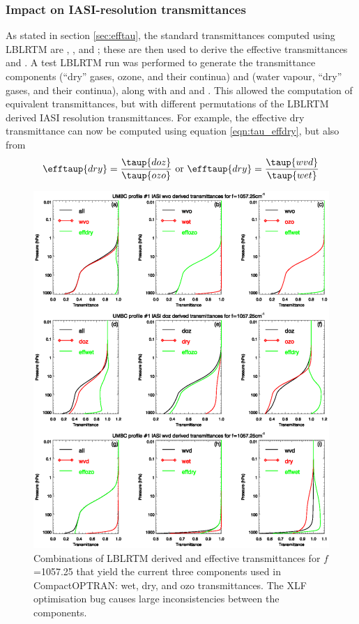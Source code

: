 \subsubsection{Impact on IASI-resolution transmittances}
\label{sec:xlf_opt_bug:sub:iasi_impact}
As stated in section \ref{sec:efftau}, the standard transmittances computed using LBLRTM are , , and ; these are then used to derive the effective transmittances  and . A test LBLRTM run was performed to generate the transmittance components  (``dry'' gases, ozone, and their continua) and  (water vapour, ``dry'' gases, and their continua), along with and  and . This allowed the computation of equivalent transmittances, but with different permutations of the LBLRTM derived IASI resolution transmittances. For example, the effective dry transmittance can now be computed using equation \ref{eqn:tau_effdry}, but also from
\begin{equation}
  \efftaup{dry} = \frac{\taup{doz}}{\taup{ozo}}\textrm{ or }\efftaup{dry} = \frac{\taup{wvd}}{\taup{wet}}
  \label{eqn:other_tau_effdry}
\end{equation}
\begin{figure}[htp]
  \centering
  \includegraphics[scale=0.8]{graphics/derived_taus_1057.25cm-1.eps}
  \caption{Combinations of LBLRTM derived and effective transmittances for $f$=1057.25\invcm{} that yield the current three components used in CompactOPTRAN: wet, dry, and ozo transmittances. The XLF optimisation bug causes large inconsistencies between the components.}
  \label{fig:derived_taus_1057.25cm-1}
\end{figure}
